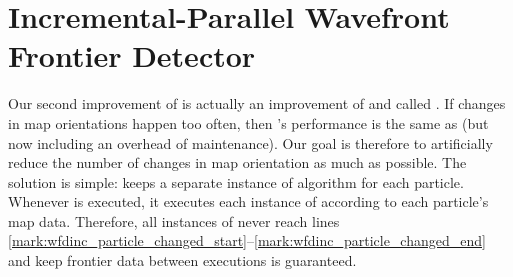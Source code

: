 \section{Incremental-Parallel Wavefront Frontier Detector}
\label{section:wfd_incremental_parallel}
Our second improvement of \WFD is actually an improvement of \WFDINC and called
\WFDIP. If changes in map orientations happen too often, then \WFDINC's
performance is the same as \WFD (but now including an overhead of maintenance).
Our goal is therefore to artificially reduce the number of changes in map
orientation as much as possible. The solution is simple: \WFDIP keeps a separate
instance of \WFDINC algorithm for each particle. Whenever \WFDIP is executed, it executes
each instance of \WFDINC according to each particle's map data. Therefore, all
instances of \WFDINC never reach lines
\ref{mark:wfdinc_particle_changed_start}--\ref{mark:wfdinc_particle_changed_end}
and keep frontier data between executions is guaranteed. 

